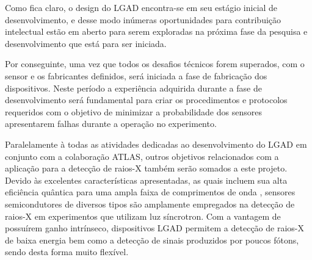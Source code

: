 Como fica claro, o design do LGAD encontra-se em seu estágio inicial de desenvolvimento, e desse modo inúmeras oportunidades para contribuição intelectual estão em aberto para serem exploradas na próxima fase da pesquisa e desenvolvimento que está para ser iniciada.%

\thispagestyle{plain}
Por conseguinte, uma vez que todos os desafios técnicos forem superados, com o sensor e os fabricantes definidos, será iniciada a fase de fabricação dos dispositivos. Neste período a experiência adquirida durante a fase de desenvolvimento será fundamental para criar os procedimentos e protocolos requeridos com o objetivo de minimizar a probabilidade dos sensores apresentarem falhas durante a operação no experimento. %

Paralelamente à todas as atividades dedicadas ao desenvolvimento do LGAD em conjunto com a colaboração ATLAS, outros objetivos relacionados com a aplicação para a detecção de raios-X também serão somados a este projeto. Devido às excelentes características apresentadas, as quais incluem sua alta eficiência quântica para uma ampla faixa de comprimentos de onda \cite{book1,book2}, sensores semicondutores de diversos tipos são amplamente empregados na detecção de raios-X em experimentos que utilizam luz síncrotron. Com a vantagem de possuírem ganho intrínseco, dispositivos LGAD permitem a detecção de raios-X de baixa energia bem como a detecção de sinais produzidos por poucos fótons, sendo desta forma muito flexível. 


